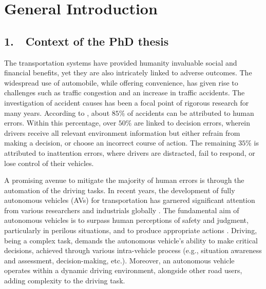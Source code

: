 
\chapter*{General Introduction}



\section*{1.\, \,  Context of the PhD thesis}

The transportation systems have provided humanity invaluable social and financial benefits, yet they are also intricately linked to adverse outcomes. The widespread use of automobile, while offering convenience, has given rise to challenges such as traffic congestion and an increase in traffic accidents. The investigation of accident causes has been a focal point of rigorous research for many years. According to \cite{humanerrors}, about $85\%$ of accidents can be attributed to human errors. Within this percentage, over $50\%$ are linked to decision errors, wherein drivers receive all relevant environment information but either refrain from making a decision, or choose an incorrect course of action. The remaining $35\%$ is attributed to inattention errors, where drivers are distracted, fail to respond, or lose control of their vehicles. 

A promising avenue to mitigate the majority of human errors is through the automation of the driving tasks. In recent years, the development of fully autonomous vehicles (AVs) for transportation has garnered significant attention from various researchers and industrials globally \cite{duarte2018impact}\cite{rosique2019systematic}\cite{schwarting2018planning}. The fundamental aim of autonomous vehicles is to surpass human perceptions of safety and judgment, particularly in perilous situations, and to produce appropriate actions \cite{dimiathesis}. Driving, being a complex task, demands the autonomous vehicle's ability to make critical decisions, achieved through various intra-vehicle process (e.g., situation awareness and assessment, decision-making, etc.). Moreover, an autonomous vehicle operates within a dynamic driving environment, alongside other road users, adding complexity to the driving task. 


